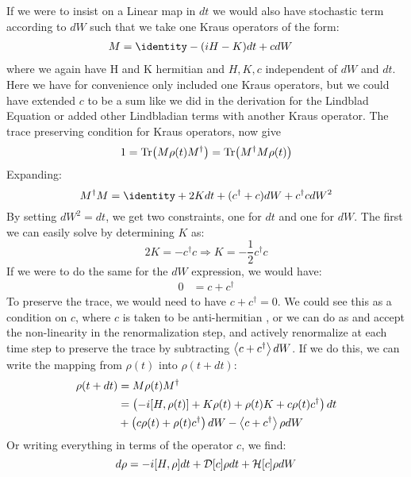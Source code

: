 If we were to insist on a Linear map in $dt$ we would also have stochastic term according to $dW$ such that we take one Kraus operators of the form:
\begin{align}
    M &=  \identity - (iH - K)dt + cdW
\end{align}
where we again have H and K hermitian and $H, K, c$ independent of $dW$ and $dt$. Here we have for convenience only included one Kraus operators, but we could have extended $c$ to be a sum like we did in the derivation for the Lindblad Equation or added other Lindbladian terms with another Kraus operator. The trace preserving condition for Kraus operators, now give
\begin{equation}
    1 = \Tr(M \rho(t) M^\dagger) = \Tr(M^\dagger M \rho(t))
\end{equation}
Expanding:
\begin{equation}\label{eq:trace_conservation}
    M^\dagger M  = \identity + 2K dt +  (c^\dagger + c)dW + c^\dagger c dW^2
\end{equation}
By setting $dW^2 = dt$, we get two constraints, one for $dt$ and one for $dW$. The first we can easily solve by determining $K$ as:
\begin{equation}
    2K = -c^\dagger c \Rightarrow K = -\frac12 c^\dagger c 
\end{equation}
If we were to do the same for the $dW$ expression, we would have:
\begin{align}
    0 &= c + c^\dagger
\end{align}
To preserve the trace, we would need to have $c + c^\dagger = 0$. We could see this as a condition on $c$, where $c$ is taken to be anti-hermitian \cite{adler_derivation_2000}, or we can do as \cite{jacobs_straightforward_2006} and accept the non-linearity in the renormalization step, and actively renormalize at each time step to preserve the trace by subtracting $\expval{c + c^\dagger}dW$. If we do this, we  can write the mapping from $\rho(t)$ into $\rho(t+dt)$:
\begin{align}
    \rho(t+dt) &= M \rho(t) M^\dagger \\
               &= \left(-i \comm{H}{\rho(t)} + K\rho(t) + \rho(t)K + c\rho(t)c^\dagger \right) dt \\
            &+\left(c\rho(t) + \rho(t)c^\dagger\right)dW  - \expval{c + c^\dagger}\rho dW
\end{align}
Or writing everything in terms of the operator $c$, we find:
\begin{equation}
    d\rho = -i \comm{H}{\rho}dt + \mathcal{D}[c]\rho dt + \mathcal{H}[c] \rho dW
\end{equation}
